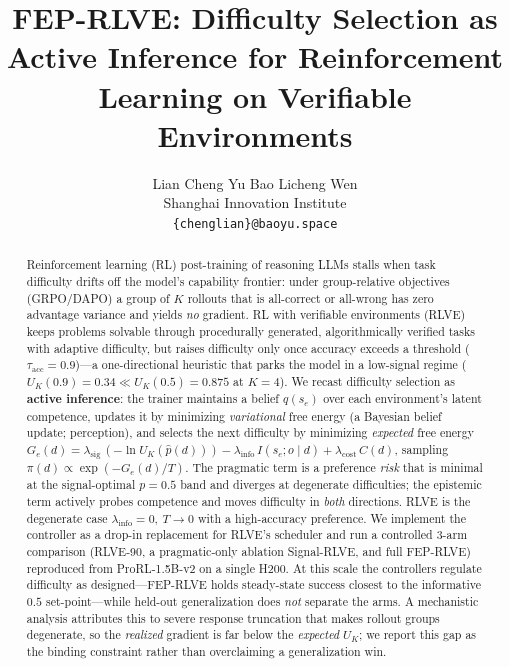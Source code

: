 \documentclass{article}
\title{FEP-RLVE: Difficulty Selection as Active Inference for Reinforcement Learning on Verifiable Environments}
\author{%
  Lian Cheng \quad Yu Bao \quad Licheng Wen \\
  Shanghai Innovation Institute \\
  \texttt{\{chenglian\}@baoyu.space}
}
\newcommand{\UK}{U_{K}}
\begin{document}
\maketitle

\begin{abstract}
Reinforcement learning (RL) post-training of reasoning LLMs stalls when task
difficulty drifts off the model's capability frontier: under group-relative
objectives (GRPO/DAPO) a group of $K$ rollouts that is all-correct or all-wrong
has zero advantage variance and yields \emph{no} gradient. RL with verifiable
environments (RLVE) keeps problems solvable through procedurally generated,
algorithmically verified tasks with adaptive difficulty, but raises difficulty
only once accuracy exceeds a threshold ($\tau_{\mathrm{acc}}{=}0.9$)---a
one-directional heuristic that parks the model in a low-signal regime
($\UK(0.9){=}0.34 \ll \UK(0.5){=}0.875$ at $K{=}4$). We recast difficulty
selection as \textbf{active inference}: the trainer maintains a belief
$q(s_e)$ over each environment's latent competence, updates it by minimizing
\emph{variational} free energy (a Bayesian belief update; perception), and
selects the next difficulty by minimizing \emph{expected} free energy
$G_e(d) = \lambda_{\mathrm{sig}}\,(-\ln \UK(\hat p(d))) - \lambda_{\mathrm{info}}\,I(s_e;o\mid d) + \lambda_{\mathrm{cost}}\,C(d)$,
sampling $\pi(d)\propto\exp(-G_e(d)/T)$. The pragmatic term is a preference
\emph{risk} that is minimal at the signal-optimal $p{=}0.5$ band and diverges at
degenerate difficulties; the epistemic term actively probes competence and moves
difficulty in \emph{both} directions. RLVE is the degenerate case
$\lambda_{\mathrm{info}}{=}0,\ T{\to}0$ with a high-accuracy preference. We
implement the controller as a drop-in replacement for RLVE's scheduler and run a
controlled 3-arm comparison (RLVE-90, a pragmatic-only ablation Signal-RLVE, and
full FEP-RLVE) reproduced from ProRL-1.5B-v2 on a single H200. At this scale the
controllers regulate difficulty as designed---FEP-RLVE holds steady-state success
closest to the informative $0.5$ set-point---while held-out generalization does
\emph{not} separate the arms. A mechanistic analysis attributes this to severe
response truncation that makes rollout groups degenerate, so the \emph{realized}
gradient is far below the \emph{expected} $\UK$; we report this gap as the
binding constraint rather than overclaiming a generalization win.
\end{abstract}
\end{document}

